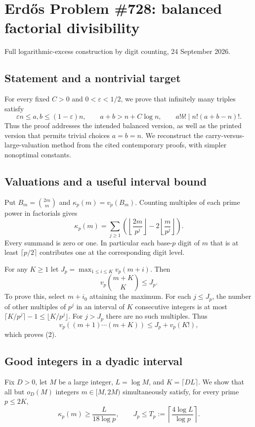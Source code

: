 \section{Erd\H{o}s Problem \#728: balanced factorial divisibility}
\noindent Full logarithmic-excess construction by digit counting, 24 September 2026.

\subsection*{Statement and a nontrivial target}
For every fixed $C>0$ and $0<\varepsilon<1/2$, we prove that infinitely many triples satisfy
\[
 \varepsilon n\leq a,b\leq(1-\varepsilon)n,\qquad
 a+b>n+C\log n,\qquad a!b!\mid n!(a+b-n)!.
\]
Thus the proof addresses the intended balanced version, as well as the printed version that permits trivial choices $a=b=n$. We reconstruct the carry-versus-large-valuation method from the cited contemporary proofs, with simpler nonoptimal constants.

\subsection*{Valuations and a useful interval bound}
Put $B_m=\binom{2m}{m}$ and $\kappa_p(m)=v_p(B_m)$. Counting multiples of each prime power in factorials gives
\[
 \kappa_p(m)=\sum_{j\geq1}
  \left(\left\lfloor\frac{2m}{p^j}\right\rfloor
       -2\left\lfloor\frac m{p^j}\right\rfloor\right). \tag{1}
\]
Every summand is zero or one. In particular each base-$p$ digit of $m$ that is at least $\lceil p/2\rceil$ contributes one at the corresponding digit level.

For any $K\geq1$ let $J_p=\max_{1\leq i\leq K}v_p(m+i)$. Then
\[
 v_p\binom{m+K}{K}\leq J_p. \tag{2}
\]
To prove this, select $m+i_0$ attaining the maximum. For each $j\leq J_p$, the number of other multiples of $p^j$ in an interval of $K$ consecutive integers is at most $\lceil K/p^j\rceil-1\leq\lfloor K/p^j\rfloor$. For $j>J_p$ there are no such multiples. Thus
\[
 v_p((m+1)\cdots(m+K))\leq J_p+v_p(K!),
\]
which proves (2).

\subsection*{Good integers in a dyadic interval}
Fix $D>0$, let $M$ be a large integer, $L=\log M$, and $K=\lceil DL\rceil$. We show that all but $o_D(M)$ integers $m\in[M,2M)$ simultaneously satisfy, for every prime $p\leq2K$,
\[
 \kappa_p(m)\geq\frac L{18\log p},
 \qquad
 J_p\leq T_p:=\left\lceil\frac{4\log L}{\log p}\right\rceil. \tag{3}
\]

